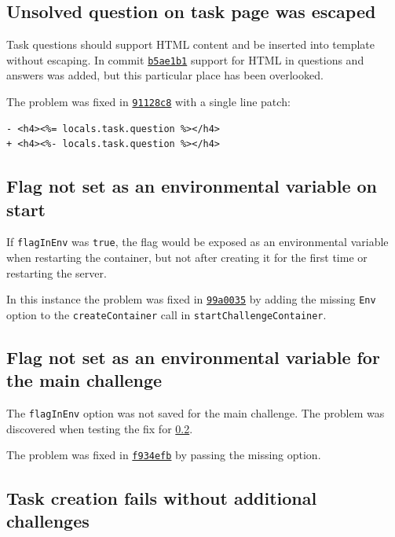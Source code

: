 \subsection{Unsolved question on task page was escaped}

Task questions should support HTML content and be inserted into template without escaping. In commit \href{https://github.com/krzysdz/inz/commit/b5ae1b16e9be6060b43f28dbb56b090bfb46dd98}{\texttt{b5ae1b1}} support for HTML in questions and answers was added, but this particular place has been overlooked.

The problem was fixed in \href{https://github.com/krzysdz/inz/commit/91128c835889ac0429b478d03c6992541fcdd5c3}{\texttt{91128c8}} with a single line patch:
\begin{verbatim}
- <h4><%= locals.task.question %></h4>
+ <h4><%- locals.task.question %></h4>
\end{verbatim}

\subsection{Flag not set as an environmental variable on start}
\label{chap:bug-env-not-set-start}

If \texttt{flagInEnv} was \texttt{true}, the flag would be exposed as an environmental variable when restarting the container, but not after creating it for the first time or restarting the server.

In this instance the problem was fixed in \href{https://github.com/krzysdz/inz/commit/99a0035c61de55ddd7203e7ced1e9fc554959f24}{\texttt{99a0035}} by adding the missing \texttt{Env} option to the \texttt{createContainer} call in \texttt{startChallengeContainer}.

\subsection{Flag not set as an environmental variable for the main challenge}

The \texttt{flagInEnv} option was not saved for the main challenge. The problem was discovered when testing the fix for \ref{chap:bug-env-not-set-start}.

The problem was fixed in \href{https://github.com/krzysdz/inz/commit/f934efb0c50f0156d73bd78fcfcd6a12b5943b1e}{\texttt{f934efb}} by passing the missing option.

\subsection{Task creation fails without additional challenges}

